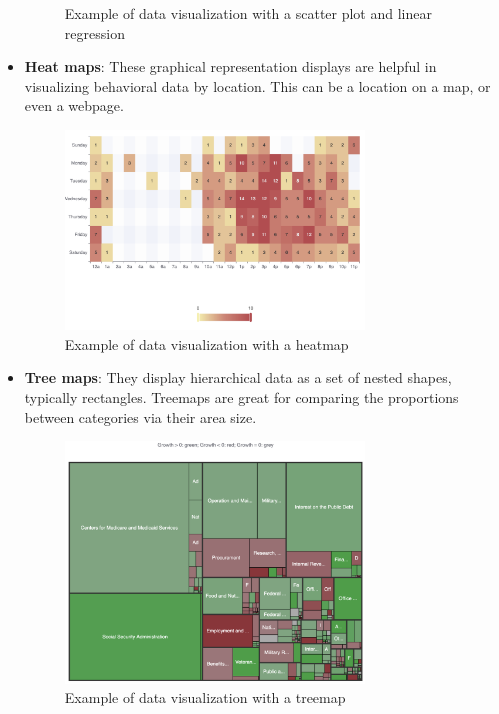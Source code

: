 \documentclass[MSE,Master,english]{twbook}%
\begin{document}
\begin{itemize}
\begin{figure}[H]
    \caption{Example of data visualization with a scatter plot and linear regression}
    \label{fig:scatter_example}
  \end{figure}
  \item \textbf{Heat maps}: These graphical representation displays are helpful in visualizing behavioral data by location. This can be a location on a map, or even a webpage.
  \begin{figure}[H]
    \centering
    \includegraphics[width=0.75\textwidth]{examples/heatmap.png}
    \caption{Example of data visualization with a heatmap}
    \label{fig:heatmap_example}
  \end{figure}
  \item \textbf{Tree maps}: They display hierarchical data as a set of nested shapes, typically rectangles. Treemaps are great for comparing the proportions between categories via their area size.
  \begin{figure}[H]
    \centering
    \includegraphics[width=0.75\textwidth]{examples/treemap.png}
    \caption{Example of data visualization with a treemap}
    \label{fig:treemap_example}
  \end{figure}
\end{itemize}
\pagebreak
\end{document}
